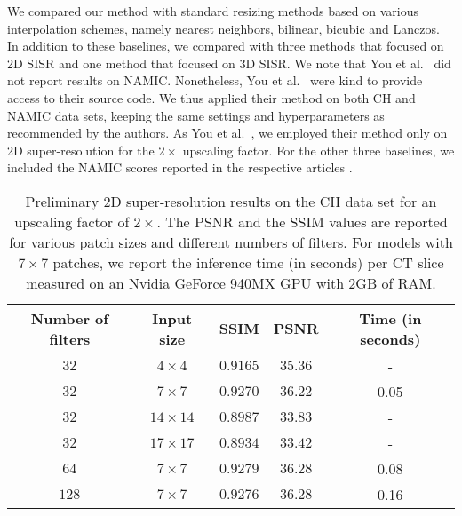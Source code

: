 \documentclass{ieeeaccess}
\begin{document}
We compared our method with standard resizing methods based on various interpolation schemes, namely nearest neighbors, bilinear, bicubic and Lanczos. In addition to these baselines, we compared with three methods \cite{Du-AS-2019, You-TMI-2019, ZENG-CBM-2018} that focused on 2D SISR and one method \cite{Pham-CMIG-2019} that focused on 3D SISR. We note that You et al.~\cite{You-TMI-2019} did not report results on NAMIC. Nonetheless, You et al.~\cite{You-TMI-2019} were kind to provide access to their source code. We thus applied their method on both CH and NAMIC data sets, keeping the same settings and hyperparameters as recommended by the authors. As You et al.~\cite{You-TMI-2019}, we employed their method only on 2D super-resolution for the $2\times$ upscaling factor. For the other three baselines, we included the NAMIC scores reported in the respective articles \cite{Du-AS-2019, Pham-CMIG-2019, ZENG-CBM-2018}.

\begin{table}[!t]
\caption{Preliminary 2D super-resolution results on the CH data set for an upscaling factor of $2\times$. The PSNR and the SSIM values are reported for various patch sizes and different numbers of filters. For models with $7 \times 7$ patches, we report the inference time (in seconds) per CT slice measured on an Nvidia GeForce 940MX GPU with 2GB of RAM.}\label{tab_preliminary_results}
\begin{center}
\setlength\tabcolsep{3.0pt}
\begin{tabular}{|c|c|c|c|c|}
\hline  
Number of filters& Input size     & SSIM           & PSNR       & Time (in seconds)      \\ 
\hline
\hline   
$32$             &  $4 \times 4$  & $0.9165$       & $35.36$    &         -              \\  
$32$             &  $7 \times 7$  & $0.9270$       & $36.22$    &        0.05             \\   
$32$             & $14 \times 14$ & $0.8987$       & $33.83$    &         -              \\  
$32$             & $17 \times 17$ & $0.8934$       & $33.42$    &         -              \\  
\hline   
$64$             &  $7 \times 7$  & $0.9279$       & $36.28$    &        0.08            \\ 
$128$            &  $7 \times 7$  & $0.9276$       & $36.28$    &        0.16            \\  
\hline   
\end{tabular}
\end{center}
\end{table}
\end{document}
